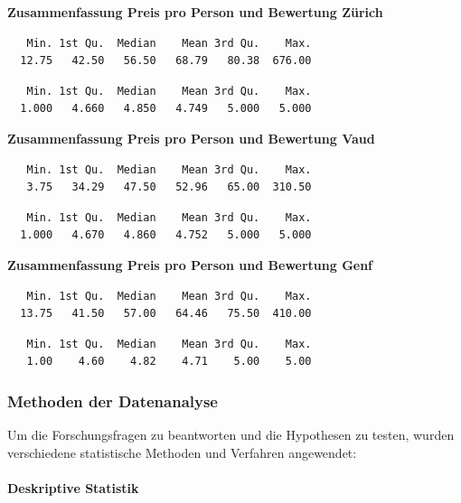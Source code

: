 \documentclass[
  journal,
]{IEEEtran}%
\let\oldparagraph\paragraph
\renewcommand{\paragraph}[1]{\oldparagraph{#1}\mbox{}}
\begin{document}
\textbf{Zusammenfassung Preis pro Person und Bewertung Zürich}

\begin{verbatim}
   Min. 1st Qu.  Median    Mean 3rd Qu.    Max. 
  12.75   42.50   56.50   68.79   80.38  676.00 
\end{verbatim}

\begin{verbatim}
   Min. 1st Qu.  Median    Mean 3rd Qu.    Max. 
  1.000   4.660   4.850   4.749   5.000   5.000 
\end{verbatim}

\textbf{Zusammenfassung Preis pro Person und Bewertung Vaud}

\begin{verbatim}
   Min. 1st Qu.  Median    Mean 3rd Qu.    Max. 
   3.75   34.29   47.50   52.96   65.00  310.50 
\end{verbatim}

\begin{verbatim}
   Min. 1st Qu.  Median    Mean 3rd Qu.    Max. 
  1.000   4.670   4.860   4.752   5.000   5.000 
\end{verbatim}

\textbf{Zusammenfassung Preis pro Person und Bewertung Genf}

\begin{verbatim}
   Min. 1st Qu.  Median    Mean 3rd Qu.    Max. 
  13.75   41.50   57.00   64.46   75.50  410.00 
\end{verbatim}

\begin{verbatim}
   Min. 1st Qu.  Median    Mean 3rd Qu.    Max. 
   1.00    4.60    4.82    4.71    5.00    5.00 
\end{verbatim}

\hypertarget{methoden-der-datenanalyse}{%
\subsubsection{Methoden der
Datenanalyse}\label{methoden-der-datenanalyse}}

Um die Forschungsfragen zu beantworten und die Hypothesen zu testen,
wurden verschiedene statistische Methoden und Verfahren angewendet:

\hypertarget{deskriptive-statistik}{%
\paragraph{\texorpdfstring{\textbf{Deskriptive
Statistik}}{Deskriptive Statistik}}\label{deskriptive-statistik}}
\end{document}
